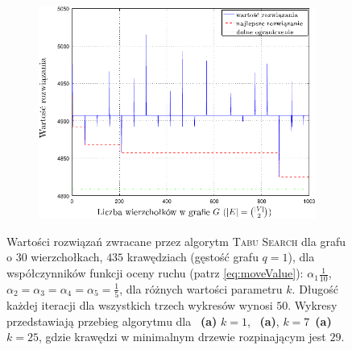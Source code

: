 \begin{figure}[!htbp]
\begin{subfigure}[b]{0.32\textwidth}
		\includegraphics[width=\textwidth]{Chapter_VI/RRIMST7-example/RRIMST7_psfrag}
		\caption{}
		\label{fig:rrimst2:c}
	\end{subfigure}
	\hfill\null
	\caption{
		Wartości rozwiązań zwracane przez algorytm \textsc{Tabu Search} dla grafu o $30$ wierzchołkach, $435$ krawędziach (gęstość grafu $q = 1$), dla współczynników funkcji oceny ruchu (patrz \ref{eq:moveValue}): $\alpha_{1} \frac{1}{10}$, $\alpha_{2} = \alpha_{3} = \alpha_{4} = \alpha_{5} = \frac{1}{5}$, dla różnych wartości parametru $k$. Długość każdej iteracji dla wszystkich trzech wykresów wynosi $50$. Wykresy przedstawiają przebieg algorytmu dla ~\textbf{(a)} $k = 1$, ~\textbf{(a)}, $k = 7$~\textbf{(a)} $k = 25$, gdzie krawędzi w minimalnym drzewie rozpinającym jest $29$.
	}
	\label{fig:rrimst2}
\end{figure}

